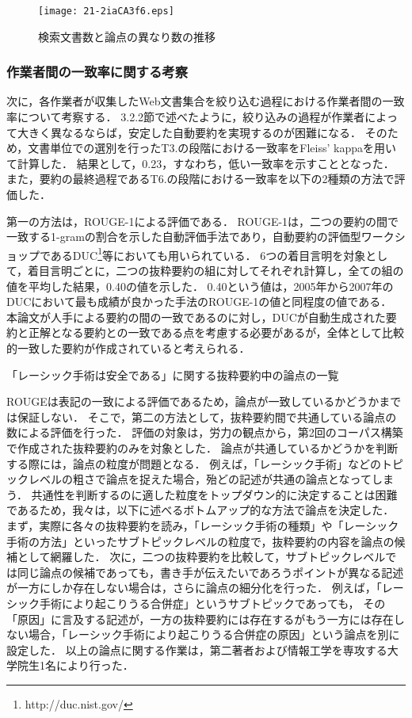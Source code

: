 \documentclass[japanese]{jnlp_1.4}
\begin{document}
\begin{figure}[t]
\begin{center}
\texttt{[image: 21-2iaCA3f6.eps]}
\end{center}
\caption{検索文書数と論点の異なり数の推移}
\label{fg:viewpoint}
\end{figure}


\subsubsection{作業者間の一致率に関する考察}

次に，各作業者が収集したWeb文書集合を絞り込む過程における作業者間の一致率について考察する．
3.2.2節で述べたように，絞り込みの過程が作業者によって大きく異なるならば，安定した自動要約を実現するのが困難になる．
そのため，文書単位での選別を行ったT3.の段階における一致率を{Fleiss'} kappaを用いて計算した．
結果として，{0.23}，すなわち，低い一致率を示すこととなった．
また，要約の最終過程であるT6.の段階における一致率を以下の2種類の方法で評価した．

第一の方法は，ROUGE-1による評価である．
ROUGE-1は，二つの要約の間で一致する1-gramの割合を示した自動評価手法であり，自動要約の評価型ワークショップであるDUC\footnote{http://duc.nist.gov/}等においても用いられている．
6つの着目言明を対象として，着目言明ごとに，二つの抜粋要約の組に対してそれぞれ計算し，全ての組の値を平均した結果，0.40の値を示した．
{0.40}という値は，2005年から2007年のDUCにおいて最も成績が良かった手法のROUGE-1の値と同程度の値である．
本論文が人手による要約の間の一致であるのに対し，DUCが自動生成された要約と正解となる要約との一致である点を考慮する必要があるが，全体として比較的一致した要約が作成されていると考えられる．

\begin{table}[t]
 \caption{「レーシック手術は安全である」に関する抜粋要約中の論点の一覧}
 \label{tb:SR_viewpoint}

\end{table}

ROUGEは表記の一致による評価であるため，論点が一致しているかどうかまでは保証しない．
そこで，第二の方法として，抜粋要約間で共通している論点の数による評価を行った．
評価の対象は，労力の観点から，第2回のコーパス構築で作成された抜粋要約のみを対象とした．
論点が共通しているかどうかを判断する際には，論点の粒度が問題となる．
例えば，「レーシック手術」などのトピックレベルの粗さで論点を捉えた場合，殆どの記述が共通の論点となってしまう．
共通性を判断するのに適した粒度をトップダウン的に決定することは困難であるため，我々は，以下に述べるボトムアップ的な方法で論点を決定した．
まず，実際に各々の抜粋要約を読み，「レーシック手術の種類」や「レーシック手術の方法」といったサブトピックレベルの粒度で，抜粋要約の内容を論点の候補として網羅した．
次に，二つの抜粋要約を比較して，サブトピックレベルでは同じ論点の候補であっても，書き手が伝えたいであろうポイントが異なる記述が一方にしか存在しない場合は，さらに論点の細分化を行った．
例えば，「レーシック手術により起こりうる合併症」というサブトピックであっても，
\pagebreak
その「原因」に言及する記述が，一方の抜粋要約には存在するがもう一方には存在しない場合，「レーシック手術により起こりうる合併症の原因」という論点を別に設定した．
以上の論点に関する作業は，第二著者および情報工学を専攻する大学院生1名により行った．
\end{document}
